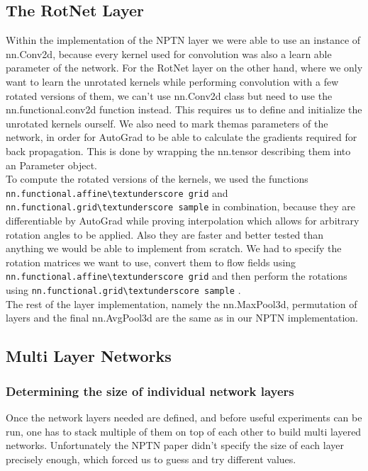 \documentclass{llncs}
\begin{document}
\subsection{The RotNet Layer}
\newcommand{\nnaffinegrid}{\nolinkurl{nn.functional.affine\textunderscore grid} }
\newcommand{\nngridsample}{\nolinkurl{nn.functional.grid\textunderscore sample} }
Within the implementation of the NPTN layer we were able to use an instance of nn.Conv2d, because every kernel used for convolution was also a learn able parameter of the network.
For the RotNet layer on the other hand, where we only want to learn the unrotated kernels while performing convolution with a few rotated versions of them, we can't use nn.Conv2d class but need to use the nn.functional.conv2d function instead.
This requires us to define and initialize the unrotated kernels ourself. We also need to mark themas parameters of the network, in order for AutoGrad to be able to calculate the gradients required for back propagation. This is done by wrapping the nn.tensor describing them into an Parameter object.\\
To compute the rotated versions of the kernels, we used the functions \nnaffinegrid and \nngridsample in combination, because they are differentiable by AutoGrad while proving interpolation which allows for arbitrary rotation angles to be applied. Also they are faster and better tested than anything we would be able to implement from scratch. We had to specify the rotation matrices we want to use, convert them to flow fields using \nnaffinegrid and then perform the rotations using \nngridsample.\\
The rest of the layer implementation, namely the nn.MaxPool3d, permutation of layers and the final nn.AvgPool3d are the same as in our NPTN implementation.

\subsection{Multi Layer Networks}
\subsubsection{Determining the size of individual network layers}
Once the network layers needed are defined, and before useful experiments can be run, one has to stack multiple of them on top of each other to build multi layered networks.
Unfortunately the NPTN paper didn't specify the size of each layer precisely enough, which forced us to guess and try different values.
\end{document}
